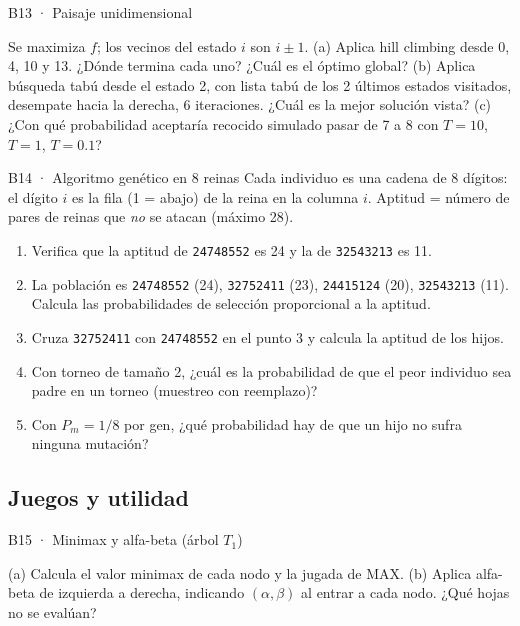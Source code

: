 \begin{ejercicio}{B13 · Paisaje unidimensional }
\begin{center}\figPaisaje\end{center}
Se maximiza $f$; los vecinos del estado $i$ son $i\pm1$.
(a) Aplica hill climbing desde 0, 4, 10 y 13. ¿Dónde termina cada uno? ¿Cuál es el óptimo global?
(b) Aplica búsqueda tabú desde el estado 2, con lista tabú de los 2 últimos estados visitados,
desempate hacia la derecha, 6 iteraciones. ¿Cuál es la mejor solución vista?
(c) ¿Con qué probabilidad aceptaría recocido simulado pasar de 7 a 8 con $T=10$, $T=1$, $T=0.1$?
\end{ejercicio}

\begin{ejercicio}{B14 · Algoritmo genético en 8 reinas }
Cada individuo es una cadena de 8 dígitos: el dígito $i$ es la fila (1 = abajo) de la reina en
la columna $i$. Aptitud = número de pares de reinas que \emph{no} se atacan (máximo 28).
\begin{enumerate}[label=(\alph*)]
\item Verifica que la aptitud de \texttt{24748552} es 24 y la de \texttt{32543213} es 11.
\item La población es \texttt{24748552} (24), \texttt{32752411} (23), \texttt{24415124} (20),
\texttt{32543213} (11). Calcula las probabilidades de selección proporcional a la aptitud.
\item Cruza \texttt{32752411} con \texttt{24748552} en el punto 3 y calcula la aptitud de los hijos.
\item Con torneo de tamaño 2, ¿cuál es la probabilidad de que el peor individuo sea padre en un torneo (muestreo con reemplazo)?
\item Con $P_m=1/8$ por gen, ¿qué probabilidad hay de que un hijo no sufra ninguna mutación?
\end{enumerate}
\end{ejercicio}

\subsection{Juegos y utilidad}

\begin{ejercicio}{B15 · Minimax y alfa-beta (árbol $T_1$) }
\begin{center}\figTUno\end{center}
(a) Calcula el valor minimax de cada nodo y la jugada de MAX.
(b) Aplica alfa-beta de izquierda a derecha, indicando $(\alpha,\beta)$ al entrar a cada nodo.
¿Qué hojas no se evalúan?
\end{ejercicio}

